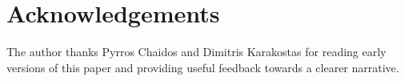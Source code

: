 \section{Acknowledgements}

The author thanks Pyrros Chaidos and Dimitris Karakostas for reading early versions of this
paper and providing useful feedback towards a clearer narrative.
